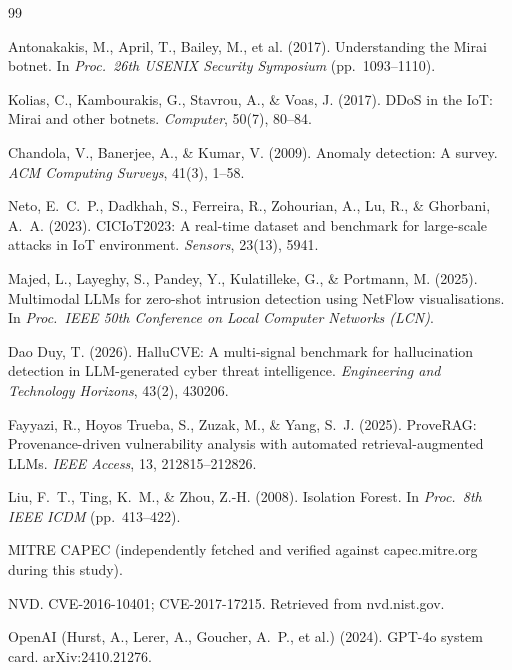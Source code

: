 \documentclass[10pt,twocolumn]{article}
\begin{document}
\begin{thebibliography}{99}

Antonakakis, M., April, T., Bailey, M., et al. (2017). Understanding the Mirai botnet. In \emph{Proc.\ 26th USENIX Security Symposium} (pp.\ 1093--1110).

Kolias, C., Kambourakis, G., Stavrou, A., \& Voas, J. (2017). DDoS in the IoT: Mirai and other botnets. \emph{Computer}, 50(7), 80--84.

Chandola, V., Banerjee, A., \& Kumar, V. (2009). Anomaly detection: A survey. \emph{ACM Computing Surveys}, 41(3), 1--58.

Neto, E.~C.~P., Dadkhah, S., Ferreira, R., Zohourian, A., Lu, R., \& Ghorbani, A.~A. (2023). CICIoT2023: A real-time dataset and benchmark for large-scale attacks in IoT environment. \emph{Sensors}, 23(13), 5941.

Majed, L., Layeghy, S., Pandey, Y., Kulatilleke, G., \& Portmann, M. (2025). Multimodal LLMs for zero-shot intrusion detection using NetFlow visualisations. In \emph{Proc.\ IEEE 50th Conference on Local Computer Networks (LCN)}.

Dao Duy, T. (2026). HalluCVE: A multi-signal benchmark for hallucination detection in LLM-generated cyber threat intelligence. \emph{Engineering and Technology Horizons}, 43(2), 430206.

Fayyazi, R., Hoyos Trueba, S., Zuzak, M., \& Yang, S.~J. (2025). ProveRAG: Provenance-driven vulnerability analysis with automated retrieval-augmented LLMs. \emph{IEEE Access}, 13, 212815--212826.

Liu, F.~T., Ting, K.~M., \& Zhou, Z.-H. (2008). Isolation Forest. In \emph{Proc.\ 8th IEEE ICDM} (pp.\ 413--422).

MITRE CAPEC (independently fetched and verified against capec.mitre.org during this study).

NVD. CVE-2016-10401; CVE-2017-17215. Retrieved from nvd.nist.gov.

OpenAI (Hurst, A., Lerer, A., Goucher, A.~P., et al.) (2024). GPT-4o system card. arXiv:2410.21276.

\end{thebibliography}
\end{document}
